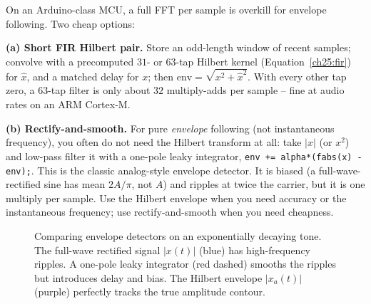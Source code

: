 \begin{buildbox}
On an Arduino-class MCU, a full FFT per sample is overkill for envelope following. Two
cheap options:

\textbf{(a) Short FIR Hilbert pair.} Store an odd-length window of recent samples; convolve
with a precomputed $31$- or $63$-tap Hilbert kernel (Equation~\eqref{ch25:fir}) for $\hat
x$, and a matched delay for $x$; then $\text{env}=\sqrt{x^2+\hat x^2}$. With every other
tap zero, a $63$-tap filter is only about $32$ multiply-adds per sample -- fine at audio
rates on an ARM Cortex-M.

\textbf{(b) Rectify-and-smooth.} For pure \emph{envelope} following (not instantaneous
frequency), you often do not need the Hilbert transform at all: take $|x|$ (or $x^2$) and
low-pass filter it with a one-pole leaky integrator,
\texttt{env += alpha*(fabs(x) - env);}. This is the classic analog-style envelope
detector. It is biased (a full-wave-rectified sine has mean $2A/\pi$, not $A$) and ripples
at twice the carrier, but it is one multiply per sample. Use the Hilbert envelope when you
need accuracy or the instantaneous frequency; use rectify-and-smooth when you need
cheapness.

\begin{figure}[H]
\centering
{}
\caption{Comparing envelope detectors on an exponentially decaying tone. The full-wave rectified signal $|x(t)|$ (blue) has high-frequency ripples. A one-pole leaky integrator (red dashed) smooths the ripples but introduces delay and bias. The Hilbert envelope $|x_a(t)|$ (purple) perfectly tracks the true amplitude contour.}
\label{ch25:fig-envelope-compare}
\end{figure}
\end{buildbox}

